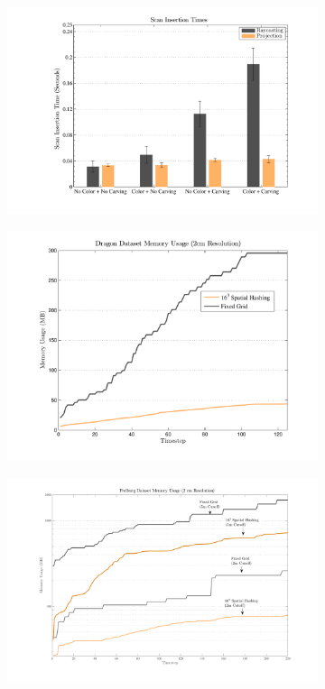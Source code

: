 \documentclass[conference,10pt]{IEEEtran}
\begin{document}
 
 \begin{figure}
  \centering
 \begin{subfigure}{1.0\columnwidth} \centering
\includegraphics[width=1.0\textwidth]{img/timing_data.pdf}
		 \caption{}
		 \label{fig:timing}
	 \end{subfigure} 
 \begin{subfigure}{1.0\columnwidth} \centering
\includegraphics[width=1.0\textwidth]{img/memoryusage.pdf}
		 \caption{} 
		 \label{fig:memory_data}
	 \end{subfigure}  
	  \begin{subfigure}{1.0\columnwidth} \centering
\includegraphics[width=1.0\textwidth]{img/memoryusage2.pdf}

\end{subfigure}
\end{figure}
\end{document}
